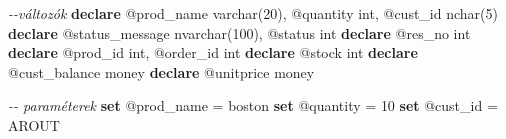 \documentclass[
  magyar,
]{article}
\newenvironment{Shaded}{}{}
\newcommand{\CommentTok}[1]{\textcolor[rgb]{0.38,0.63,0.69}{\textit{#1}}}
\newcommand{\DataTypeTok}[1]{\textcolor[rgb]{0.56,0.13,0.00}{#1}}
\newcommand{\DecValTok}[1]{\textcolor[rgb]{0.25,0.63,0.44}{#1}}
\newcommand{\KeywordTok}[1]{\textcolor[rgb]{0.00,0.44,0.13}{\textbf{#1}}}
\newcommand{\NormalTok}[1]{#1}
\newcommand{\OperatorTok}[1]{\textcolor[rgb]{0.40,0.40,0.40}{#1}}
\newcommand{\StringTok}[1]{\textcolor[rgb]{0.25,0.44,0.63}{#1}}
\begin{document}
\begin{Shaded}
\begin{Highlighting}[]
\CommentTok{{-}{-}változók}
\KeywordTok{declare}\NormalTok{ @prod\_name }\DataTypeTok{varchar}\NormalTok{(}\DecValTok{20}\NormalTok{), @quantity }\DataTypeTok{int}\NormalTok{, @cust\_id }\DataTypeTok{nchar}\NormalTok{(}\DecValTok{5}\NormalTok{)}
\KeywordTok{declare}\NormalTok{ @status\_message }\DataTypeTok{nvarchar}\NormalTok{(}\DecValTok{100}\NormalTok{), @status }\DataTypeTok{int}
\KeywordTok{declare}\NormalTok{ @res\_no }\DataTypeTok{int}
\KeywordTok{declare}\NormalTok{ @prod\_id }\DataTypeTok{int}\NormalTok{, @order\_id }\DataTypeTok{int}
\KeywordTok{declare}\NormalTok{ @stock }\DataTypeTok{int}
\KeywordTok{declare}\NormalTok{ @cust\_balance money}
\KeywordTok{declare}\NormalTok{ @unitprice money}

\CommentTok{{-}{-} paraméterek}
\KeywordTok{set}\NormalTok{ @prod\_name }\OperatorTok{=} \StringTok{\textquotesingle{}boston\textquotesingle{}}
\KeywordTok{set}\NormalTok{ @quantity }\OperatorTok{=} \DecValTok{10}
\KeywordTok{set}\NormalTok{ @cust\_id }\OperatorTok{=} \StringTok{\textquotesingle{}AROUT\textquotesingle{}}


\end{Highlighting}
\end{Shaded}
\end{document}
